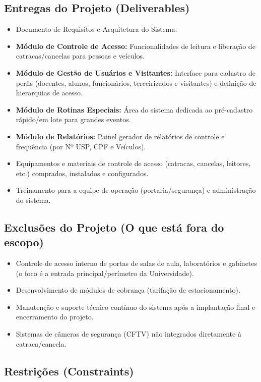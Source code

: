 \documentclass[a4paper]{article}
\begin{document}
\subsection{Entregas do Projeto (Deliverables)}

\begin{itemize}
    \item Documento de Requisitos e Arquitetura do Sistema.
    \item \textbf{Módulo de Controle de Acesso:} Funcionalidades de leitura e liberação de catracas/cancelas para pessoas e veículos.
    \item \textbf{Módulo de Gestão de Usuários e Visitantes:} Interface para cadastro de perfis (docentes, alunos, funcionários, terceirizados e visitantes) e definição de hierarquias de acesso.
    \item \textbf{Módulo de Rotinas Especiais:} Área do sistema dedicada ao pré-cadastro rápido/em lote para grandes eventos.
    \item \textbf{Módulo de Relatórios:} Painel gerador de relatórios de controle e frequência (por Nº USP, CPF e Veículos).
    \item Equipamentos e materiais de controle de acesso (catracas, cancelas, leitores, etc.) comprados, instalados e configurados.
    \item Treinamento para a equipe de operação (portaria/segurança) e administração do sistema.
\end{itemize}

\subsection{Exclusões do Projeto (O que está fora do escopo)}

\begin{itemize}
    \item Controle de acesso interno de portas de salas de aula, laboratórios e gabinetes (o foco é a entrada principal/perímetro da Universidade).
    \item Desenvolvimento de módulos de cobrança (tarifação de estacionamento).
    \item Manutenção e suporte técnico contínuo do sistema após a implantação final e encerramento do projeto.
    \item Sistemas de câmeras de segurança (CFTV) não integrados diretamente à catraca/cancela.
\end{itemize}

\subsection{Restrições (Constraints)}
\end{document}
